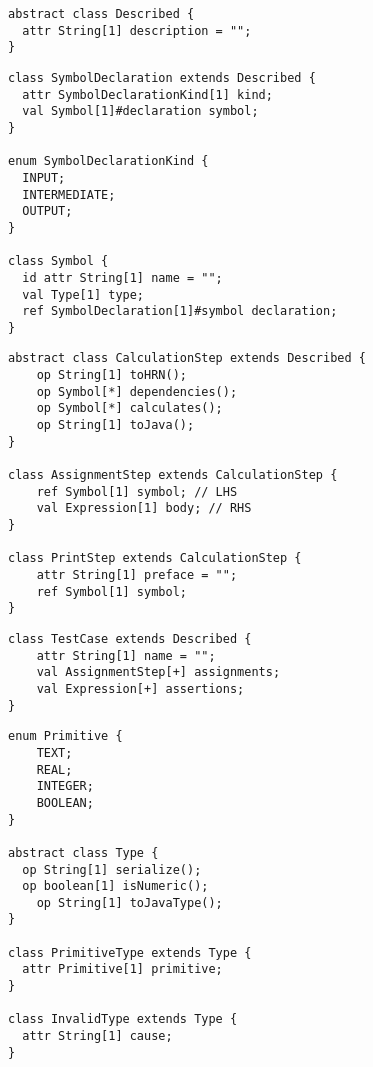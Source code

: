 \documentclass[11pt,fleqn]{article}
\begin{document}
\begin{lstlisting}[caption={Abstract Class: Described},label={lst:described}]
abstract class Described {
  attr String[1] description = "";
}
\end{lstlisting}

\begin{lstlisting}[caption={Symbol Declarations},label={lst:symbol-declarations}]
class SymbolDeclaration extends Described {
  attr SymbolDeclarationKind[1] kind;
  val Symbol[1]#declaration symbol;
}

enum SymbolDeclarationKind {
  INPUT;
  INTERMEDIATE;
  OUTPUT;
}

class Symbol {
  id attr String[1] name = "";
  val Type[1] type;
  ref SymbolDeclaration[1]#symbol declaration;
}
\end{lstlisting}

\begin{lstlisting}[caption={Calculation Steps},label={lst:calculation-steps}]
abstract class CalculationStep extends Described {
	op String[1] toHRN();
	op Symbol[*] dependencies();
	op Symbol[*] calculates();
	op String[1] toJava();
}

class AssignmentStep extends CalculationStep {
	ref Symbol[1] symbol; // LHS
	val Expression[1] body; // RHS
}

class PrintStep extends CalculationStep {
	attr String[1] preface = "";
	ref Symbol[1] symbol;
}
\end{lstlisting}

\begin{lstlisting}[caption={Test Case},label={lst:test-case}]
class TestCase extends Described {
	attr String[1] name = "";
	val AssignmentStep[+] assignments;
	val Expression[+] assertions;
}
\end{lstlisting}

\begin{lstlisting}[caption={Type Universe},label={lst:type-universe}]
enum Primitive {
	TEXT;
	REAL;
	INTEGER;
	BOOLEAN;
}

abstract class Type {
  op String[1] serialize();
  op boolean[1] isNumeric();
	op String[1] toJavaType();
}

class PrimitiveType extends Type {
  attr Primitive[1] primitive;
}

class InvalidType extends Type {
  attr String[1] cause;
}
\end{lstlisting}
\end{document}
